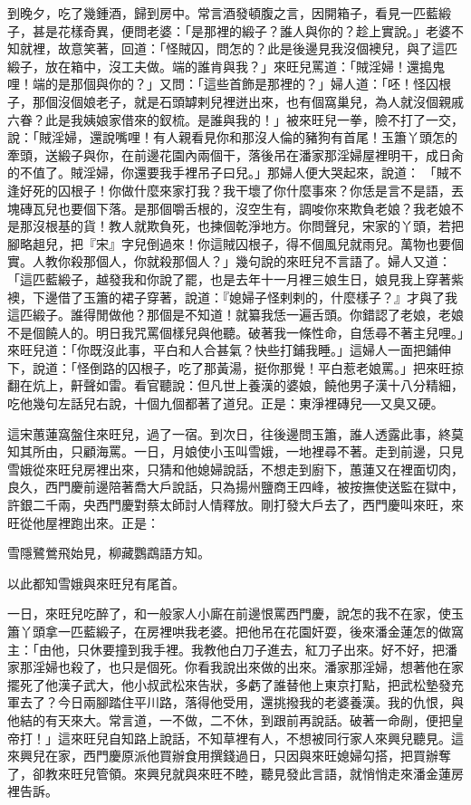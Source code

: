 \begin{showcontents}{}
到晚夕，吃了幾鍾酒，歸到房中。常言酒發頓腹之言，因開箱子，看見一匹藍緞子，甚是花樣奇異，便問老婆：「是那裡的緞子？誰人與你的？趁上實說。」老婆不知就裡，故意笑著，回道：「怪賊囚，問怎的？此是後邊見我沒個襖兒，與了這匹緞子，放在箱中，沒工夫做。端的誰肯與我？」來旺兒罵道：「賊淫婦！還搗鬼哩！端的是那個與你的？」又問：「這些首飾是那裡的？」婦人道：「呸！怪囚根子，那個沒個娘老子，就是石頭罅剌兒裡迸出來，也有個窩巢兒，為人就沒個親戚六眷？此是我姨娘家借來的釵梳。是誰與我的！」被來旺兒一拳，險不打了一交，說：「賊淫婦，還說嘴哩！有人親看見你和那沒人倫的豬狗有首尾！玉簫丫頭怎的牽頭，送緞子與你，在前邊花園內兩個干，落後吊在潘家那淫婦屋裡明干，成日肏的不值了。賊淫婦，你還要我手裡吊子曰兒。」那婦人便大哭起來，說道： 「賊不逢好死的囚根子！你做什麼來家打我？我干壞了你什麼事來？你恁是言不是語，丟塊磚瓦兒也要個下落。是那個嚼舌根的，沒空生有，調唆你來欺負老娘？我老娘不是那沒根基的貨！教人就欺負死，也揀個乾淨地方。你問聲兒，宋家的丫頭，若把腳略趄兒，把『宋』字兒倒過來！你這賊囚根子，得不個風兒就雨兒。萬物也要個實。人教你殺那個人，你就殺那個人？」幾句說的來旺兒不言語了。婦人又道：「這匹藍緞子，越發我和你說了罷，也是去年十一月裡三娘生日，娘見我上穿著紫襖，下邊借了玉簫的裙子穿著，說道：『媳婦子怪剌剌的，什麼樣子？』才與了我這匹緞子。誰得閒做他？那個是不知道！就纂我恁一遍舌頭。你錯認了老娘，老娘不是個饒人的。明日我咒罵個樣兒與他聽。破著我一條性命，自恁尋不著主兒哩。」來旺兒道：「你既沒此事，平白和人合甚氣？快些打鋪我睡。」這婦人一面把鋪伸下，說道：「怪倒路的囚根子，吃了那黃湯，挺你那覺！平白惹老娘罵。」把來旺掠翻在炕上，鼾聲如雷。看官聽說：但凡世上養漢的婆娘，饒他男子漢十八分精細，吃他幾句左話兒右說，十個九個都著了道兒。正是：東淨裡磚兒──又臭又硬。

這宋蕙蓮窩盤住來旺兒，過了一宿。到次日，往後邊問玉簫，誰人透露此事，終莫知其所由，只顧海罵。一日，月娘使小玉叫雪娥，一地裡尋不著。走到前邊，只見雪娥從來旺兒房裡出來，只猜和他媳婦說話，不想走到廚下，蕙蓮又在裡面切肉，良久，西門慶前邊陪著喬大戶說話，只為揚州鹽商王四峰，被按撫使送監在獄中，許銀二千兩，央西門慶對蔡太師討人情釋放。剛打發大戶去了，西門慶叫來旺，來旺從他屋裡跑出來。正是：

雪隱鷺鶯飛始見，柳藏鸚鵡語方知。

以此都知雪娥與來旺兒有尾首。

一日，來旺兒吃醉了，和一般家人小廝在前邊恨罵西門慶，說怎的我不在家，使玉簫丫頭拿一匹藍緞子，在房裡哄我老婆。把他吊在花園奸耍，後來潘金蓮怎的做窩主：「由他，只休要撞到我手裡。我教他白刀子進去，紅刀子出來。好不好，把潘家那淫婦也殺了，也只是個死。你看我說出來做的出來。潘家那淫婦，想著他在家擺死了他漢子武大，他小叔武松來告狀，多虧了誰替他上東京打點，把武松墊發充軍去了？今日兩腳踏住平川路，落得他受用，還挑撥我的老婆養漢。我的仇恨，與他結的有天來大。常言道，一不做，二不休，到跟前再說話。破著一命剮，便把皇帝打！」這來旺兒自知路上說話，不知草裡有人，不想被同行家人來興兒聽見。這來興兒在家，西門慶原派他買辦食用撰錢過日，只因與來旺媳婦勾搭，把買辦奪了，卻教來旺兒管領。來興兒就與來旺不睦，聽見發此言語，就悄悄走來潘金蓮房裡告訴。


\end{showcontents}
